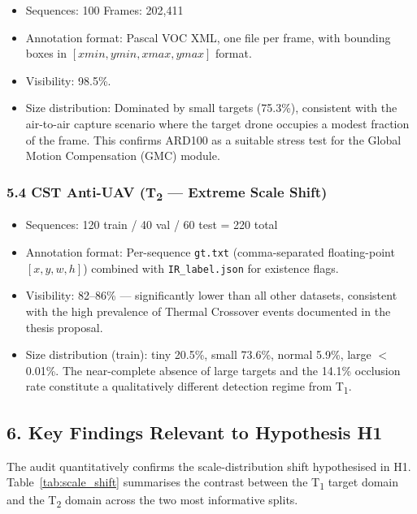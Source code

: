 \begin{itemize}
    \item Sequences: 100 \quad Frames: 202,411
    \item Annotation format: Pascal VOC XML, one file per frame,
          with bounding boxes in $[\mathit{xmin}, \mathit{ymin},
          \mathit{xmax}, \mathit{ymax}]$ format.
    \item Visibility: 98.5\%.
    \item Size distribution: Dominated by small targets
          (75.3\%), consistent with the air-to-air capture scenario where
          the target drone occupies a modest fraction of the frame.
          This confirms ARD100 as a suitable stress test for the
          Global Motion Compensation (GMC) module.
\end{itemize}

\subsubsection*{5.4 CST Anti-UAV (T\textsubscript{2} --- Extreme Scale Shift)}

\begin{itemize}
    \item Sequences: 120 train / 40 val / 60 test = 220 total
    \item Annotation format: Per-sequence \texttt{gt.txt}
          (comma-separated floating-point $[x, y, w, h]$) combined with
          \texttt{IR\_label.json} for existence flags.
    \item Visibility: 82--86\% — significantly lower than all
          other datasets, consistent with the high prevalence of Thermal
          Crossover events documented in the thesis proposal.
    \item Size distribution (train): tiny 20.5\%, small 73.6\%,
          normal 5.9\%, large $<$0.01\%. The near-complete absence of
          large targets and the 14.1\% occlusion rate constitute a
          qualitatively different detection regime from T\textsubscript{1}.
\end{itemize}

\subsection*{6. Key Findings Relevant to Hypothesis H1}

The audit quantitatively confirms the scale-distribution shift
hypothesised in H1. Table~\ref{tab:scale_shift} summarises the
contrast between the T\textsubscript{1} target domain and the
T\textsubscript{2} domain across the two most informative splits.

